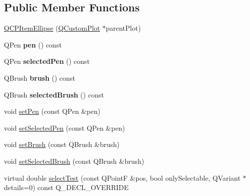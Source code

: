 \subsection*{Public Member Functions}
\begin{DoxyCompactItemize}
\item 
\hyperlink{classQCPItemEllipse_a759b77ef002515eba0263b5447ecb3fb}{Q\+C\+P\+Item\+Ellipse} (\hyperlink{classQCustomPlot}{Q\+Custom\+Plot} $\ast$parent\+Plot)
\item 
Q\+Pen {\bfseries pen} () const \hypertarget{classQCPItemEllipse_adb67471eabaf1214c99767f1653ca0ed}{}\label{classQCPItemEllipse_adb67471eabaf1214c99767f1653ca0ed}

\item 
Q\+Pen {\bfseries selected\+Pen} () const \hypertarget{classQCPItemEllipse_ac52ab52225d238365ff3264b4b69130f}{}\label{classQCPItemEllipse_ac52ab52225d238365ff3264b4b69130f}

\item 
Q\+Brush {\bfseries brush} () const \hypertarget{classQCPItemEllipse_ac012e4fd59fdb1afb6554937bae8f7e1}{}\label{classQCPItemEllipse_ac012e4fd59fdb1afb6554937bae8f7e1}

\item 
Q\+Brush {\bfseries selected\+Brush} () const \hypertarget{classQCPItemEllipse_a0043e401a912d54ea3195bab0967b394}{}\label{classQCPItemEllipse_a0043e401a912d54ea3195bab0967b394}

\item 
void \hyperlink{classQCPItemEllipse_adb81a663ed2420fcfa011e49f678d1a6}{set\+Pen} (const Q\+Pen \&pen)
\item 
void \hyperlink{classQCPItemEllipse_a6c542fba1dc918041c583f58a50dde99}{set\+Selected\+Pen} (const Q\+Pen \&pen)
\item 
void \hyperlink{classQCPItemEllipse_a49fc74e6965834e873d027d026def798}{set\+Brush} (const Q\+Brush \&brush)
\item 
void \hyperlink{classQCPItemEllipse_a9693501cfaa43a099655c75bed0dab3f}{set\+Selected\+Brush} (const Q\+Brush \&brush)
\item 
virtual double \hyperlink{classQCPItemEllipse_ab6e2b8a29695c606c7731e498297ca29}{select\+Test} (const Q\+PointF \&pos, bool only\+Selectable, Q\+Variant $\ast$details=0) const Q\+\_\+\+D\+E\+C\+L\+\_\+\+O\+V\+E\+R\+R\+I\+DE
\end{DoxyCompactItemize}
